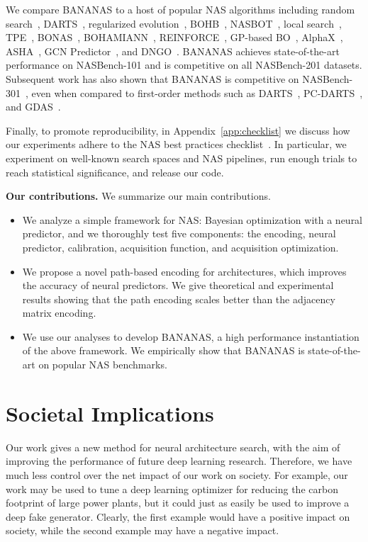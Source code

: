 \documentclass[11pt]{article}
\numberwithin{equation}{section}
\numberwithin{figure}{section}
\theoremstyle{plain}
\theoremstyle{definition}
\let\citep\cite
\begin{document}
We compare BANANAS to a host of popular NAS algorithms including
random search~\cite{randomnas},
DARTS~\cite{darts},
regularized evolution~\cite{real2019regularized}, 
BOHB~\cite{bohb},
NASBOT~\cite{nasbot},
local search~\cite{white2020local},
TPE~\cite{tpe},
BONAS~\cite{shi2019multi},
BOHAMIANN~\cite{springenberg2016bayesian},
REINFORCE~\cite{reinforce}, 
GP-based BO~\cite{snoek2012practical}, 
AlphaX~\cite{alphax}, 
ASHA~\cite{randomnas}, 
GCN Predictor~\cite{wen2019neural}, and
DNGO~\cite{snoek2015scalable}.
BANANAS achieves state-of-the-art performance on NASBench-101 and is competitive
on all NASBench-201 datasets.
Subsequent work has also shown that BANANAS is competitive on 
NASBench-301~\citep{nasbench301},
even when compared to first-order methods such as
DARTS~\cite{darts}, PC-DARTS~\cite{pcdarts}, and GDAS~\cite{gdas}.

Finally, to promote reproducibility, in
Appendix~\ref{app:checklist} 
we discuss how our experiments
adhere to the NAS best practices checklist~\cite{lindauer2019best}.
In particular, we experiment on well-known search spaces and NAS pipelines,
run enough trials to reach statistical significance,
and release our code.

\noindent\textbf{Our contributions.}
We summarize our main contributions.
\begin{itemize}[topsep=0pt, itemsep=2pt, parsep=0pt, leftmargin=5mm]
    \item 
    We analyze a simple framework for NAS: Bayesian optimization with a
    neural predictor, and we thoroughly test five components:
    the encoding, neural predictor, calibration,
    acquisition function, and acquisition optimization.
    \item 
    We propose a novel path-based encoding for architectures,
    which improves the accuracy of neural predictors.
    We give theoretical and experimental results showing 
    that the path encoding scales better than the 
    adjacency matrix encoding.
    \item 
    We use our analyses to develop BANANAS, a high performance instantiation
    of the above framework.
    We empirically show that BANANAS is state-of-the-art on popular
    NAS benchmarks.
\end{itemize}

 

\section{Societal Implications} \label{sec:impact}
Our work gives a new method for neural architecture search, with the aim of
improving the performance of future deep learning research.
Therefore, we have much less control over the net impact of our work on
society. For example, our work may be used to tune a deep
learning optimizer for reducing the carbon footprint of large power plants,
but it could just as easily be used to improve a deep fake generator.
Clearly, the first example would have a positive impact on society, while
the second example may have a negative impact.
\end{document}

